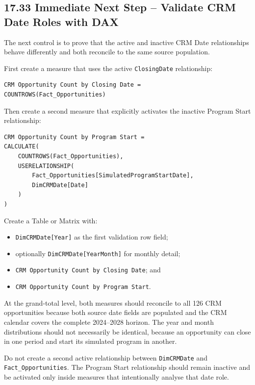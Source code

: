 \documentclass[11pt,a4paper]{article}
\begin{document}
\subsection{17.33 Immediate Next Step -- Validate CRM Date Roles with DAX}

The next control is to prove that the active and inactive CRM Date relationships
behave differently and both reconcile to the same source population.

First create a measure that uses the active \texttt{ClosingDate} relationship:

\begin{lstlisting}[style=powerquery]
CRM Opportunity Count by Closing Date =
COUNTROWS(Fact_Opportunities)
\end{lstlisting}

Then create a second measure that explicitly activates the inactive Program
Start relationship:

\begin{lstlisting}[style=powerquery]
CRM Opportunity Count by Program Start =
CALCULATE(
    COUNTROWS(Fact_Opportunities),
    USERELATIONSHIP(
        Fact_Opportunities[SimulatedProgramStartDate],
        DimCRMDate[Date]
    )
)
\end{lstlisting}

Create a Table or Matrix with:

\begin{itemize}[leftmargin=7mm,itemsep=2pt]
    \item \texttt{DimCRMDate[Year]} as the first validation row field;
    \item optionally \texttt{DimCRMDate[YearMonth]} for monthly detail;
    \item \texttt{CRM Opportunity Count by Closing Date}; and
    \item \texttt{CRM Opportunity Count by Program Start}.
\end{itemize}

At the grand-total level, both measures should reconcile to all 126 CRM
opportunities because both source date fields are populated and the CRM calendar
covers the complete 2024--2028 horizon. The year and month distributions should
not necessarily be identical, because an opportunity can close in one period
and start its simulated program in another.

\begin{warningbox}

Do not create a second active relationship between \texttt{DimCRMDate} and
\texttt{Fact\_Opportunities}. The Program Start relationship should remain
inactive and be activated only inside measures that intentionally analyse that
date role.

\end{warningbox}
\end{document}
